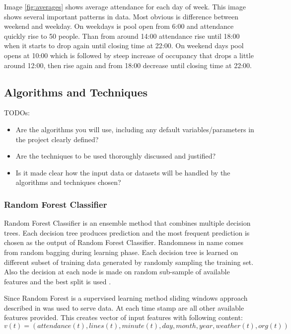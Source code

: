 \documentclass{article}
\begin{document}
Image \ref{fig:averages} shows average attendance for each day of week. This image shows several important patterns in data. Most obvious is difference between weekend and weekday. On weekdays is pool open from 6:00 and attendance quickly rise to 50 people. Than from around 14:00 attendance rise until 18:00 when it starts to drop again until closing time at 22:00. On weekend days pool opens at 10:00 which is followed by steep increase of occupancy that drops a little around 12:00, then rise again and from 18:00 decrease until closing time at 22:00.

\subsection{Algorithms and Techniques}
\color{red}
TODOs:
\begin{itemize}
    \item Are the algorithms you will use, including any default variables/parameters in the project clearly defined?
    \item Are the techniques to be used thoroughly discussed and justified?
    \item Is it made clear how the input data or datasets will be handled by the algorithms and techniques chosen?
\end{itemize}
\color{black}

\subsubsection{Random Forest Classifier}
Random Forest Classifier is an ensemble method that combines multiple decision trees. Each decision tree produces prediction and the most frequent prediction is chosen as the output of Random Forest Classifier. Randomness in name comes from random bagging during learning phase. Each decision tree is learned on different subset of training data generated by randomly sampling the training set. Also the decision at each node is made on random sub-sample of available features and the best split is used \citep{yiu2019randomforest} \citep{wiki2019randomforest}.


Since Random Forest is a supervised learning method sliding windows approach described in \citep{brownlee2019howtosupervised} was used to serve data. At each time stamp are all other available features provided. This creates vector of input features with following content:
\begin{equation}
\label{eq:input_vector}
v(t) = (attendance(t), lines(t), minute(t), day, month, year, weather(t), org(t))
\end{equation}
\end{document}

